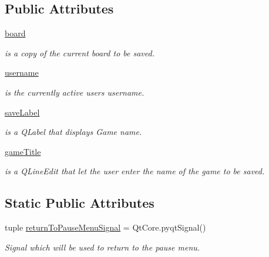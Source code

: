 \subsection*{Public Attributes}
\begin{DoxyCompactItemize}
\item 
\hyperlink{classsrc_1_1save__menu_1_1_save_menu_a5d5d8515ced22884dcd1a7f5d1943566}{board}
\begin{DoxyCompactList}\small\item\em is a copy of the current board to be saved. \end{DoxyCompactList}\item 
\hyperlink{classsrc_1_1save__menu_1_1_save_menu_afa694276e009bcb004df7c7a1a5da217}{username}
\begin{DoxyCompactList}\small\item\em is the currently active user\textquotesingle{}s username. \end{DoxyCompactList}\item 
\hyperlink{classsrc_1_1save__menu_1_1_save_menu_aed6ba9a74fc14066593c5ce7b2ae4691}{save\+Label}
\begin{DoxyCompactList}\small\item\em is a Q\+Label that displays \textquotesingle{}Game name\textquotesingle{}. \end{DoxyCompactList}\item 
\hyperlink{classsrc_1_1save__menu_1_1_save_menu_a0673d06683a2c9f326d36958fe339a2a}{game\+Title}
\begin{DoxyCompactList}\small\item\em is a Q\+Line\+Edit that let the user enter the name of the game to be saved. \end{DoxyCompactList}\end{DoxyCompactItemize}
\subsection*{Static Public Attributes}
\begin{DoxyCompactItemize}
\item 
tuple \hyperlink{classsrc_1_1save__menu_1_1_save_menu_a91e3384b3ca4264682fd7cc2fce47b0f}{return\+To\+Pause\+Menu\+Signal} = Qt\+Core.\+pyqt\+Signal()
\begin{DoxyCompactList}\small\item\em Signal which will be used to return to the pause menu. \end{DoxyCompactList}\end{DoxyCompactItemize}


